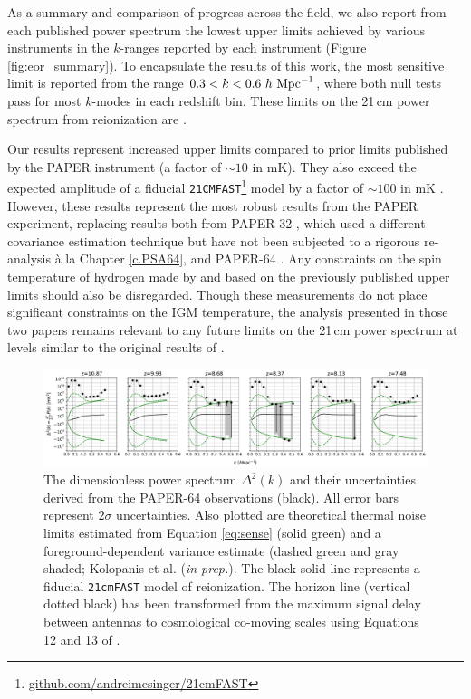 As a summary and comparison of progress across the field, we also report from each published power spectrum the lowest upper limits achieved by various instruments in the $k$-ranges reported by each instrument (Figure \ref{fig:eor_summary}). To encapsulate the results of this work, the most sensitive limit is reported from
the range $0.3 <  k < 0.6\ h\ {\rm Mpc}^{-1}$, where both null tests
pass for most $k$-modes in each redshift bin.
These limits on the 21\,cm power spectrum
from reionization are \upperlims.

Our results represent increased upper limits compared to prior limits published by the PAPER instrument (a factor of $\sim10$ in mK). They also exceed the expected
amplitude of a fiducial \texttt{21CMFAST}\footnote{\url{github.com/andreimesinger/21cmFAST}}
 model by a factor of $\sim100$ in mK \citep{mesinger_et_al2011}. However, these results represent the
most robust results from the PAPER experiment, replacing results both from PAPER-32 \citep{parsons_et_al2014,jacobs_et_al2015,moore_et_al2017},
which used a different covariance estimation technique
 but have not been subjected to a rigorous re-analysis
\`{a} la Chapter \ref{c.PSA64}, and
PAPER-64 \citep{ali_et_al2015,ali_et_al2018}.
Any constraints on the spin temperature of hydrogen made by
\citet{pober_et_al2015} and \citet{greig_et_al2015a} based on the
previously published upper limits should also be disregarded.
Though these measurements do not place significant constraints on the IGM
temperature, the analysis presented in those two
papers remains relevant to any future limits on the 21\,cm power spectrum 
at levels similar to the original results of .

\begin{figure}[tp]
\centering
\includegraphics[width=\textwidth]{plots/pspec_flagged_ants_delta2.pdf}
\caption{The dimensionless power spectrum $\Delta^{2}(k)$ and their uncertainties derived from the PAPER-64 observations (black).
All error bars represent $ 2\sigma $ uncertainties. Also plotted are theoretical thermal noise limits estimated from Equation \eqref{eq:sense} (solid green) and a foreground-dependent variance estimate (dashed green and gray shaded; Kolopanis et al. (\textit{in prep.}).
The black solid line represents a fiducial \texttt{21cmFAST} model of reionization.
The horizon line (vertical dotted black) has been transformed from the maximum
signal delay between antennas to cosmological co-moving scales using Equations 12 and 13  of \citet{liu_et_al2014a}. }
\label{fig:pspec_delta2}
\end{figure}

